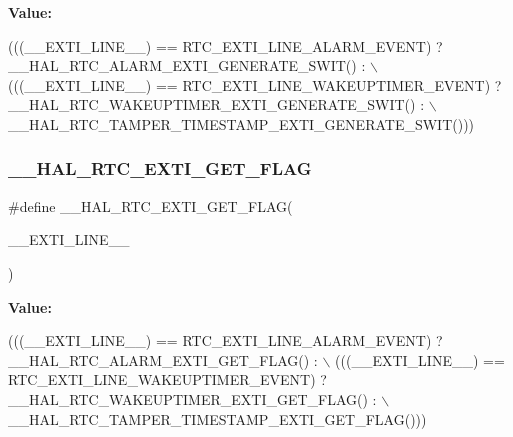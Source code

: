 {\bfseries Value\+:}
\begin{DoxyCode}
(((\_\_EXTI\_LINE\_\_) == RTC\_EXTI\_LINE\_ALARM\_EVENT) ? \_\_HAL\_RTC\_ALARM\_EXTI\_GENERATE\_SWIT() : \(\backslash\)
                                                      (((\_\_EXTI\_LINE\_\_) == RTC\_EXTI\_LINE\_WAKEUPTIMER\_EVENT)
       ? \_\_HAL\_RTC\_WAKEUPTIMER\_EXTI\_GENERATE\_SWIT() :  \(\backslash\)
                                                          \_\_HAL\_RTC\_TAMPER\_TIMESTAMP\_EXTI\_GENERATE\_SWIT()))
\end{DoxyCode}
\mbox{\label{group___h_a_l___r_t_c___aliased___macros_ga7ff2ab63c65042a0a9ef683d345abf49}} 
\subsubsection{\texorpdfstring{\+\_\+\+\_\+\+H\+A\+L\+\_\+\+R\+T\+C\+\_\+\+E\+X\+T\+I\+\_\+\+G\+E\+T\+\_\+\+F\+L\+AG}{\_\_HAL\_RTC\_EXTI\_GET\_FLAG}}
{\footnotesize\ttfamily \#define \+\_\+\+\_\+\+H\+A\+L\+\_\+\+R\+T\+C\+\_\+\+E\+X\+T\+I\+\_\+\+G\+E\+T\+\_\+\+F\+L\+AG(\begin{DoxyParamCaption}\item[{}]{\+\_\+\+\_\+\+E\+X\+T\+I\+\_\+\+L\+I\+N\+E\+\_\+\+\_\+ }\end{DoxyParamCaption})}

{\bfseries Value\+:}
\begin{DoxyCode}
(((\_\_EXTI\_LINE\_\_) == RTC\_EXTI\_LINE\_ALARM\_EVENT) ? \_\_HAL\_RTC\_ALARM\_EXTI\_GET\_FLAG() : \(\backslash\)
                                                  (((\_\_EXTI\_LINE\_\_) == RTC\_EXTI\_LINE\_WAKEUPTIMER\_EVENT) ? 
      \_\_HAL\_RTC\_WAKEUPTIMER\_EXTI\_GET\_FLAG() : \(\backslash\)
                                                      \_\_HAL\_RTC\_TAMPER\_TIMESTAMP\_EXTI\_GET\_FLAG()))
\end{DoxyCode}
